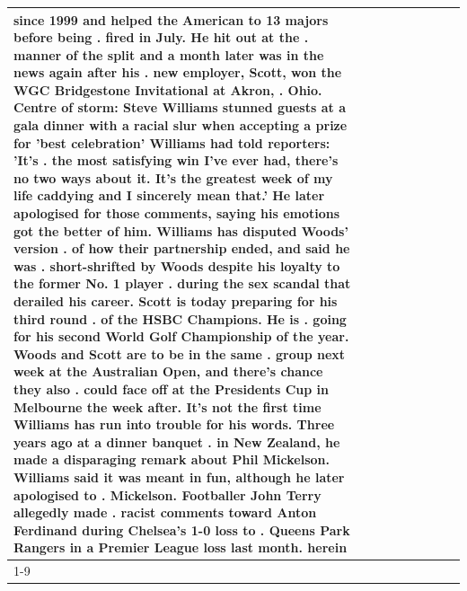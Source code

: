 \begin{table}[H]
\begin{tabular}{lllrlllll}
since 1999 and helped the American to 13 majors before being . fired in July. He hit out at the . manner of the split and a month later was in the news again after his . new employer, Scott, won the WGC Bridgestone Invitational at Akron, . Ohio. Centre of storm: Steve Williams stunned guests at a gala dinner with a racial slur when accepting a prize for 'best celebration' Williams had told reporters: 'It's . the most satisfying win I've ever had, there's no two ways about it. It's the greatest week of my life caddying and I sincerely mean that.' He later apologised for those comments, saying his emotions got the better of him. Williams has disputed Woods' version . of how their partnership ended, and said he was . short-shrifted by Woods despite his loyalty to the former No. 1 player . during the sex scandal that derailed his career. Scott is today preparing for his third round . of the HSBC Champions. He is . going for his second World Golf Championship of the year. Woods and Scott are to be in the same . group next week at the Australian Open, and there's chance they also . could face off at the Presidents Cup in Melbourne the week after. It's not the first time Williams has run into trouble for his words. Three years ago at a dinner banquet . in New Zealand, he made a disparaging remark about Phil Mickelson. Williams said it was meant in fun, although he later apologised to . Mickelson. Footballer John Terry allegedly made . racist comments toward Anton Ferdinand during Chelsea's 1-0 loss to . Queens Park Rangers in a Premier League loss last month. herein \\
\cline{1-9}

\end{tabular}
\end{table}

